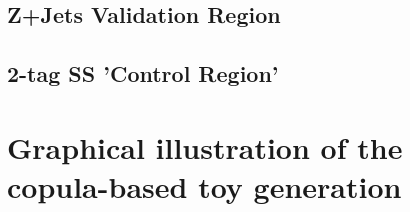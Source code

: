 \section{Z+Jets Validation Region}

\section{2-tag SS 'Control Region'}


\chapter{Graphical illustration of the copula-based toy generation}
\label{app:graphical_illustration_copula_model}

